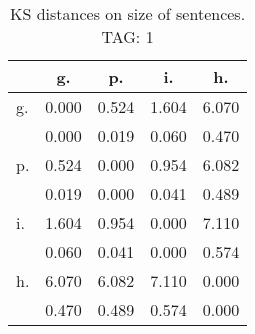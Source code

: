 \begin{table}[h!]
\begin{center}
\begin{tabular}{| l | c | c | c | c |}\hline
 & g. & p. & i. & h. \\\hline
g. & 0.000  & 0.524  & 1.604  & 6.070 \\\hline
 & 0.000  & 0.019  & 0.060  & 0.470 \\\hline
p. & 0.524  & 0.000  & 0.954  & 6.082 \\\hline
 & 0.019  & 0.000  & 0.041  & 0.489 \\\hline
i. & 1.604  & 0.954  & 0.000  & 7.110 \\\hline
 & 0.060  & 0.041  & 0.000  & 0.574 \\\hline
h. & 6.070  & 6.082  & 7.110  & 0.000 \\\hline
 & 0.470  & 0.489  & 0.574  & 0.000 \\\hline
\end{tabular}
\caption{KS distances on size of sentences. TAG: 1}
\end{center}
\end{table}